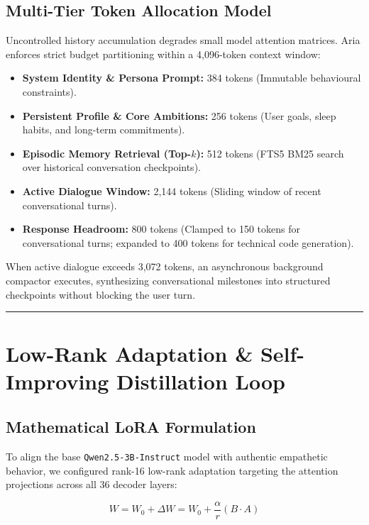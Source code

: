 \documentclass[10pt,a4paper]{article}
\begin{document}
\subsection{Multi-Tier Token Allocation Model}
Uncontrolled history accumulation degrades small model attention matrices. Aria enforces strict budget partitioning within a 4,096-token context window:
\begin{itemize}
    \item \textbf{System Identity \& Persona Prompt:} 384 tokens (Immutable behavioural constraints).
    \item \textbf{Persistent Profile \& Core Ambitions:} 256 tokens (User goals, sleep habits, and long-term commitments).
    \item \textbf{Episodic Memory Retrieval (Top-$k$):} 512 tokens (FTS5 BM25 search over historical conversation checkpoints).
    \item \textbf{Active Dialogue Window:} 2,144 tokens (Sliding window of recent conversational turns).
    \item \textbf{Response Headroom:} 800 tokens (Clamped to 150 tokens for conversational turns; expanded to 400 tokens for technical code generation).
\end{itemize}

When active dialogue exceeds 3,072 tokens, an asynchronous background compactor executes, synthesizing conversational milestones into structured checkpoints without blocking the user turn.

\vspace{3pt}
\hrule
\vspace{5pt}

\section{Low-Rank Adaptation \& Self-Improving Distillation Loop}

\subsection{Mathematical LoRA Formulation}
To align the base \texttt{Qwen2.5-3B-Instruct} model with authentic empathetic behavior, we configured rank-16 low-rank adaptation targeting the attention projections across all 36 decoder layers:

\begin{equation}
W = W_0 + \Delta W = W_0 + \frac{\alpha}{r} (B \cdot A)
\end{equation}
\end{document}

